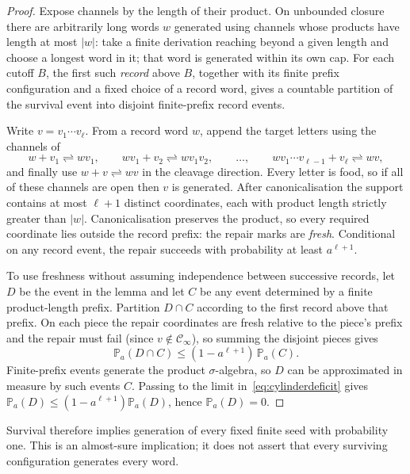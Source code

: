 \documentclass[11pt,a4paper]{article}
\theoremstyle{plain}
\theoremstyle{definition}
\theoremstyle{remark}
\newcommand{\Prob}{\mathbb{P}}
\newcommand{\cl}{\mathcal{C}}
\begin{document}
\begin{proof}
Expose channels by the length of their product. On unbounded closure there are arbitrarily long words $w$ generated using channels whose products have length at most $|w|$: take a finite derivation reaching beyond a given length and choose a longest word in it; that word is generated within its own cap. For each cutoff $B$, the first such \emph{record} above $B$, together with its finite prefix configuration and a fixed choice of a record word, gives a countable partition of the survival event into disjoint finite-prefix record events.

Write $v=v_1\cdots v_\ell$. From a record word $w$, append the target letters using the channels of
\[
w+v_1\rightleftharpoons wv_1,\qquad wv_1+v_2\rightleftharpoons wv_1v_2,\qquad\ldots,\qquad wv_1\cdots v_{\ell-1}+v_\ell\rightleftharpoons wv,
\]
and finally use $w+v\rightleftharpoons wv$ in the cleavage direction. Every letter is food, so if all of these channels are open then $v$ is generated. After canonicalisation the support contains at most $\ell+1$ distinct coordinates, each with product length strictly greater than $|w|$. Canonicalisation preserves the product, so every required coordinate lies outside the record prefix: the repair marks are \emph{fresh}. Conditional on any record event, the repair succeeds with probability at least $a^{\ell+1}$.

To use freshness without assuming independence between successive records, let $D$ be the event in the lemma and let $C$ be any event determined by a finite product-length prefix. Partition $D\cap C$ according to the first record above that prefix. On each piece the repair coordinates are fresh relative to the piece's prefix and the repair must fail (since $v\notin\cl_\infty$), so summing the disjoint pieces gives
\begin{equation}\label{eq:cylinderdeficit}
\Prob_a(D\cap C)\le(1-a^{\ell+1})\,\Prob_a(C).
\end{equation}
Finite-prefix events generate the product $\sigma$-algebra, so $D$ can be approximated in measure by such events $C$. Passing to the limit in~\eqref{eq:cylinderdeficit} gives $\Prob_a(D)\le(1-a^{\ell+1})\Prob_a(D)$, hence $\Prob_a(D)=0$.
\end{proof}

Survival therefore implies generation of every fixed finite seed with probability one. This is an almost-sure implication; it does not assert that every surviving configuration generates every word.
\end{document}
